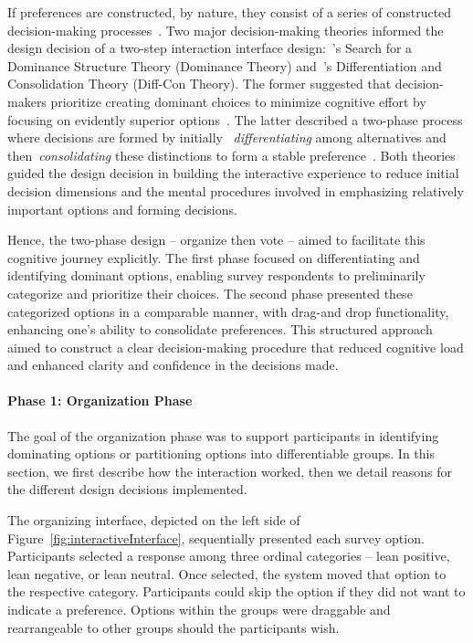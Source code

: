 If preferences are constructed, by nature, they consist of a series of constructed decision-making processes~\cite{lichtensteinConstructionPreference2006}. Two major decision-making theories informed the design decision of a two-step interaction interface design:~\textcite{montgomeryDecisionRulesSearch1983}'s Search for a Dominance Structure Theory (Dominance Theory) and~\textcite{svensonDifferentiationConsolidationTheory1992}'s Differentiation and Consolidation Theory (Diff-Con Theory). The former suggested that decision-makers prioritize creating dominant choices to minimize cognitive effort by focusing on evidently superior options~\cite{montgomeryDecisionRulesSearch1983}. The latter described a two-phase process where decisions are formed by initially ~\textit{differentiating} among alternatives and then~\textit{consolidating} these distinctions to form a stable preference~\cite{svensonDifferentiationConsolidationTheory1992}. Both theories guided the design decision in building the interactive experience to reduce initial decision dimensions and the mental procedures involved in emphasizing relatively important options and forming decisions.

Hence, the two-phase design -- organize then vote -- aimed to facilitate this cognitive journey explicitly. The first phase focused on differentiating and identifying dominant options, enabling survey respondents to preliminarily categorize and prioritize their choices. The second phase presented these categorized options in a comparable manner, with drag-and drop functionality, enhancing one's ability to consolidate preferences. This structured approach aimed to construct a clear decision-making procedure that reduced cognitive load and enhanced clarity and confidence in the decisions made.

\paragraph{Phase 1: Organization Phase}
The goal of the organization phase was to support participants in identifying dominating options or partitioning options into differentiable groups. In this section, we first describe how the interaction worked, then we detail reasons for the different design decisions implemented.

The organizing interface, depicted on the left side of Figure~\ref{fig:interactiveInterface}, sequentially presented each survey option. Participants selected a response among three ordinal categories -- lean positive, lean negative, or lean neutral. Once selected, the system moved that option to the respective category. Participants could skip the option if they did not want to indicate a preference. Options within the groups were draggable and rearrangeable to other groups should the participants wish.

